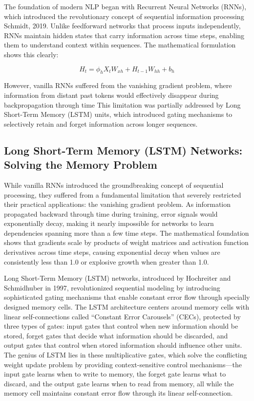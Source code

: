 \documentclass[
  titlepage]{article}
\begin{document}
The foundation of modern NLP began with Recurrent Neural Networks
(RNNs), which introduced the revolutionary concept of sequential
information processing Schmidt, 2019. Unlike feedforward networks that
process inputs independently, RNNs maintain hidden states that carry
information across time steps, enabling them to understand context
within sequences. The mathematical formulation shows this clearly:

\[
H_t = \phi_h X_t W_{xh} + H_{t-1} W_{hh} + b_h
\]

However, vanilla RNNs suffered from the vanishing gradient problem,
where information from distant past tokens would effectively disappear
during backpropagation through time This limitation was partially
addressed by Long Short-Term Memory (LSTM) units, which introduced
gating mechanisms to selectively retain and forget information across
longer sequences.

\subsection{Long Short-Term Memory (LSTM) Networks: Solving the Memory
Problem}\label{long-short-term-memory-lstm-networks-solving-the-memory-problem}

While vanilla RNNs introduced the groundbreaking concept of sequential
processing, they suffered from a fundamental limitation that severely
restricted their practical applications: the vanishing gradient problem.
As information propagated backward through time during training, error
signals would exponentially decay, making it nearly impossible for
networks to learn dependencies spanning more than a few time steps. The
mathematical foundation shows that gradients scale by products of weight
matrices and activation function derivatives across time steps, causing
exponential decay when values are consistently less than 1.0 or
explosive growth when greater than 1.0.

Long Short-Term Memory (LSTM) networks, introduced by Hochreiter and
Schmidhuber in 1997, revolutionized sequential modeling by introducing
sophisticated gating mechanisms that enable constant error flow through
specially designed memory cells. The LSTM architecture centers around
memory cells with linear self-connections called ``Constant Error
Carousels'' (CECs), protected by three types of gates: input gates that
control when new information should be stored, forget gates that decide
what information should be discarded, and output gates that control when
stored information should influence other units. The genius of LSTM lies
in these multiplicative gates, which solve the conflicting weight update
problem by providing context-sensitive control mechanisms---the input
gate learns when to write to memory, the forget gate learns what to
discard, and the output gate learns when to read from memory, all while
the memory cell maintains constant error flow through its linear
self-connection.
\end{document}
